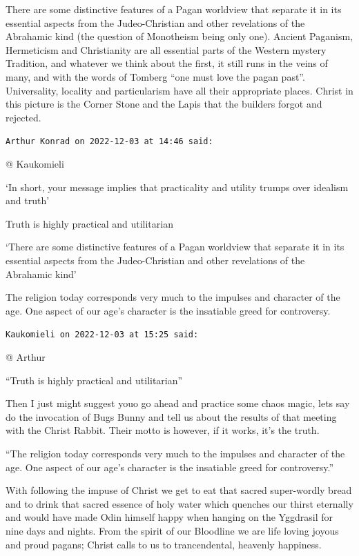 \begin{footnotesize}
\begin{sffamily}
There are some distinctive features of a Pagan worldview that separate it in its essential aspects from the Judeo-Christian and other revelations of the Abrahamic kind (the question of Monotheism being only one). Ancient Paganism, Hermeticism and Christianity are all essential parts of the Western mystery Tradition, and whatever we think about the first, it still runs in the veins of many, and with the words of Tomberg “one must love the pagan past”. Universality, locality and particularism have all their appropriate places. Christ in this picture is the Corner Stone and the Lapis that the builders forgot and rejected.

\hfill

\texttt{Arthur Konrad on 2022-12-03 at 14:46 said:}

{@} Kaukomieli

‘In short, your message implies that practicality and utility trumps over idealism and truth’

Truth is highly practical and utilitarian

‘There are some distinctive features of a Pagan worldview that separate it in its essential aspects from the Judeo-Christian and other revelations of the Abrahamic kind’

The religion today corresponds very much to the impulses and character of the age. One aspect of our age’s character is the insatiable greed for controversy.

\hfill

\texttt{Kaukomieli on 2022-12-03 at 15:25 said:}

{@} Arthur

“Truth is highly practical and utilitarian”

Then I just might suggest youo go ahead and practice some chaos magic, lets say do the invocation of Bugs Bunny and tell us about the results of that meeting with the Christ Rabbit. Their motto is however, if it works, it’s the truth.

“The religion today corresponds very much to the impulses and character of the age. One aspect of our age’s character is the insatiable greed for controversy.”

With following the impuse of Christ we get to eat that sacred super-wordly bread and to drink that sacred essence of holy water which quenches our thirst eternally and would have made Odin himself happy when hanging on the Yggdrasil for nine days and nights. From the spirit of our Bloodline we are life loving joyous and proud pagans; Christ calls to us to trancendental, heavenly happiness.


\end{sffamily}
\end{footnotesize}
